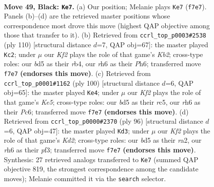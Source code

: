 \documentclass[11pt]{article}
\begin{document}
\clearpage

\begin{figure}[p]\centering
\begin{subfigure}{0.46\textwidth}\centering
\resizebox{\linewidth}{!}{%
\newchessgame
\chessboard[
  setfen={8/5k2/7R/3B4/1P5p/4K3/2r5/8 b - - 1 49},
  showmover=false,
  pgfstyle=straightmove, color=movearrow, markmove={f7-e7}
]}
\caption{}
\end{subfigure}\hfill
\begin{subfigure}{0.46\textwidth}\centering
\resizebox{\linewidth}{!}{%
\newchessgame
\chessboard[
  setfen={8/7p/7P/5k2/1r6/6R1/1K6/8 w - - 0 56},
  showmover=false,
  pgfstyle=straightmove, color=movearrow, markmove={b2-c2}
]}
\caption{}
\end{subfigure}
\\[4pt]
\begin{subfigure}{0.46\textwidth}\centering
\resizebox{\linewidth}{!}{%
\newchessgame
\chessboard[
  setfen={8/4k3/2P5/2r1K3/p7/6R1/8/8 w - - 5 51},
  showmover=false,
  pgfstyle=straightmove, color=movearrow, markmove={e5-e4}
]}
\caption{}
\end{subfigure}\hfill
\begin{subfigure}{0.46\textwidth}\centering
\resizebox{\linewidth}{!}{%
\newchessgame
\chessboard[
  setfen={8/8/8/6k1/1P6/5p2/r2K4/7R w - - 4 49},
  showmover=false,
  pgfstyle=straightmove, color=movearrow, markmove={d2-d3}
]}
\caption{}
\end{subfigure}
\caption{\textbf{Move 49, Black: \texttt{Ke7}.} (a) Our position; Melanie plays \texttt{Ke7} (\texttt{f7e7}). Panels (b)--(d) are the retrieved master positions whose correspondence most drove this move (highest QAP objective among those that transfer to it). (b) Retrieved from \texttt{ccrl\_top\_p0003\#2538} (ply 110) [structural distance $d$=7, QAP obj=67]: the master played \texttt{Kc2}; under $\mu$ our \emph{Kf2} plays the role of that game's \emph{Kb2}; cross-type roles: our \emph{b}d5 as their \emph{r}b4, our \emph{r}h6 as their \emph{P}h6; transferred move \texttt{f7e7} \textbf{(endorses this move)}. (c) Retrieved from \texttt{ccrl\_top\_p0001\#1162} (ply 100) [structural distance $d$=6, QAP obj=65]: the master played \texttt{Ke4}; under $\mu$ our \emph{Kf2} plays the role of that game's \emph{Ke5}; cross-type roles: our \emph{b}d5 as their \emph{r}c5, our \emph{r}h6 as their \emph{P}c6; transferred move \texttt{f7e7} \textbf{(endorses this move)}. (d) Retrieved from \texttt{ccrl\_top\_p0000\#2370} (ply 96) [structural distance $d$=6, QAP obj=47]: the master played \texttt{Kd3}; under $\mu$ our \emph{Kf2} plays the role of that game's \emph{Kd2}; cross-type roles: our \emph{b}d5 as their \emph{r}a2, our \emph{r}h6 as their \emph{p}f3; transferred move \texttt{f7e7} \textbf{(endorses this move)}. Synthesis: 27 retrieved analogs transferred to \texttt{Ke7} (summed QAP objective 819, the strongest correspondence among the candidate moves); Melanie committed it via the \texttt{search} selector.}
\label{fig:thought-m97}
\end{figure}
\end{document}
